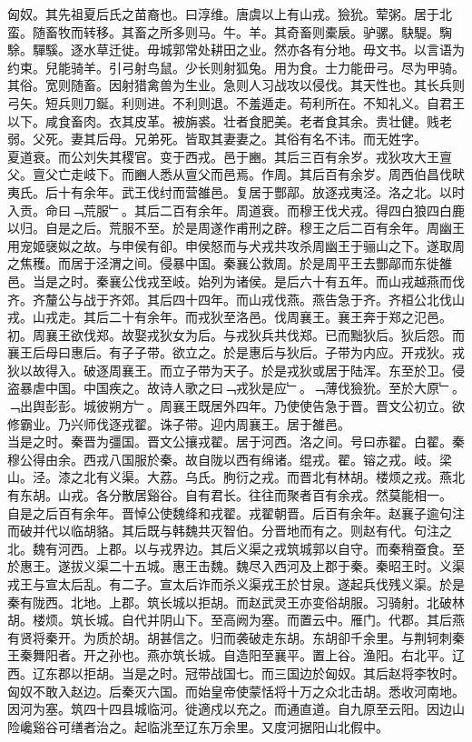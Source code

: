 \documentclass{zhvt-classic}
\begin{document}

\hspace*{2em}匈奴。其先祖夏后氏之苗裔也。曰淳维。唐虞以上有山戎。獫狁。荤粥。居于北蛮。随畜牧而转移。其畜之所多则马。牛。羊。其奇畜则橐扆。驴骡。駃騠。騊駼。驒騱。逐水草迁徙。毋城郭常处耕田之业。然亦各有分地。毋文书。以言语为约束。兒能骑羊。引弓射鸟鼠。少长则射狐兔。用为食。士力能毌弓。尽为甲骑。其俗。宽则随畜。因射猎禽兽为生业。急则人习战攻以侵伐。其天性也。其长兵则弓矢。短兵则刀鋋。利则进。不利则退。不羞遁走。苟利所在。不知礼义。自君王以下。咸食畜肉。衣其皮革。被旃裘。壮者食肥美。老者食其余。贵壮健。贱老弱。父死。妻其后母。兄弟死。皆取其妻妻之。其俗有名不讳。而无姓字。\\
\hspace*{2em}夏道衰。而公刘失其稷官。变于西戎。邑于豳。其后三百有余岁。戎狄攻大王亶父。亶父亡走岐下。而豳人悉从亶父而邑焉。作周。其后百有余岁。周西伯昌伐畎夷氏。后十有余年。武王伐纣而营雒邑。复居于酆鄗。放逐戎夷泾。洛之北。以时入贡。命曰﹁荒服﹂。其后二百有余年。周道衰。而穆王伐犬戎。得四白狼四白鹿以归。自是之后。荒服不至。於是周遂作甫刑之辟。穆王之后二百有余年。周幽王用宠姬襃姒之故。与申侯有卻。申侯怒而与犬戎共攻杀周幽王于骊山之下。遂取周之焦穫。而居于泾渭之间。侵暴中国。秦襄公救周。於是周平王去酆鄗而东徙雒邑。当是之时。秦襄公伐戎至岐。始列为诸侯。是后六十有五年。而山戎越燕而伐齐。齐釐公与战于齐郊。其后四十四年。而山戎伐燕。燕告急于齐。齐桓公北伐山戎。山戎走。其后二十有余年。而戎狄至洛邑。伐周襄王。襄王奔于郑之氾邑。初。周襄王欲伐郑。故娶戎狄女为后。与戎狄兵共伐郑。已而黜狄后。狄后怨。而襄王后母曰惠后。有子子带。欲立之。於是惠后与狄后。子带为内应。开戎狄。戎狄以故得入。破逐周襄王。而立子带为天子。於是戎狄或居于陆浑。东至於卫。侵盗暴虐中国。中国疾之。故诗人歌之曰﹁戎狄是应﹂。﹁薄伐獫狁。至於大原﹂。﹁出舆彭彭。城彼朔方﹂。周襄王既居外四年。乃使使告急于晋。晋文公初立。欲修霸业。乃兴师伐逐戎翟。诛子带。迎内周襄王。居于雒邑。\\
\hspace*{2em}当是之时。秦晋为彊国。晋文公攘戎翟。居于河西。洛之间。号曰赤翟。白翟。秦穆公得由余。西戎八国服於秦。故自陇以西有绵诸。绲戎。翟。镕之戎。岐。梁山。泾。漆之北有义渠。大荔。乌氏。朐衍之戎。而晋北有林胡。楼烦之戎。燕北有东胡。山戎。各分散居谿谷。自有君长。往往而聚者百有余戎。然莫能相一。\\
\hspace*{2em}自是之后百有余年。晋悼公使魏绛和戎翟。戎翟朝晋。后百有余年。赵襄子逾句注而破并代以临胡貉。其后既与韩魏共灭智伯。分晋地而有之。则赵有代。句注之北。魏有河西。上郡。以与戎界边。其后义渠之戎筑城郭以自守。而秦稍蚕食。至於惠王。遂拔义渠二十五城。惠王击魏。魏尽入西河及上郡于秦。秦昭王时。义渠戎王与宣太后乱。有二子。宣太后诈而杀义渠戎王於甘泉。遂起兵伐残义渠。於是秦有陇西。北地。上郡。筑长城以拒胡。而赵武灵王亦变俗胡服。习骑射。北破林胡。楼烦。筑长城。自代并阴山下。至高阙为塞。而置云中。雁门。代郡。其后燕有贤将秦开。为质於胡。胡甚信之。归而袭破走东胡。东胡卻千余里。与荆轲刺秦王秦舞阳者。开之孙也。燕亦筑长城。自造阳至襄平。置上谷。渔阳。右北平。辽西。辽东郡以拒胡。当是之时。冠带战国七。而三国边於匈奴。其后赵将李牧时。匈奴不敢入赵边。后秦灭六国。而始皇帝使蒙恬将十万之众北击胡。悉收河南地。因河为塞。筑四十四县城临河。徙適戍以充之。而通直道。自九原至云阳。因边山险巉谿谷可缮者治之。起临洮至辽东万余里。又度河据阳山北假中。\\
\end{document}
